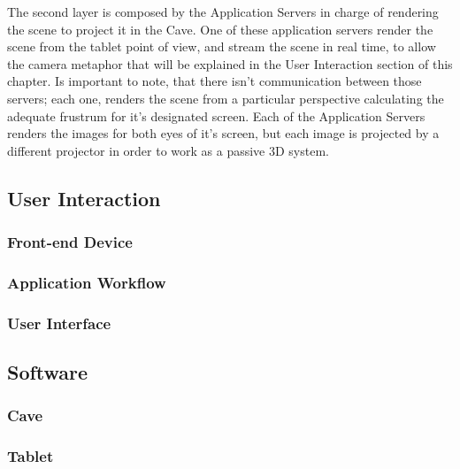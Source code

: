 The second layer is composed by the Application Servers in charge of rendering the scene to project it in the Cave. One of these application servers render the scene from the tablet point of view, and stream the scene in real time, to allow the camera metaphor that will be explained in the User Interaction section of this chapter. Is important to note, that there isn't communication between those servers; each one, renders the scene from a particular perspective calculating the adequate frustrum for it's designated screen. Each of the Application Servers renders the images for both eyes of it's screen, but each image is projected by a different projector in order to work as a passive 3D system.
\subsection{User Interaction}
\subsubsection{Front-end Device}
\subsubsection{Application Workflow}
\subsubsection{User Interface}

\subsection{Software}
\subsubsection{Cave}
\subsubsection{Tablet}
